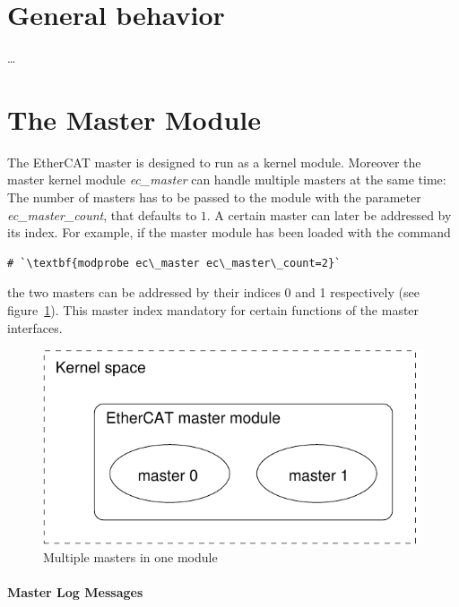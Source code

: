 \documentclass[a4paper,12pt,BCOR6mm,bibtotoc,idxtotoc]{scrbook}
\begin{document}

\section{General behavior} %

\ldots


\section{The Master Module} %
\label{sec:mastermod}

The EtherCAT master is designed to run as a kernel module. Moreover
the master kernel module \textit{ec\_master} can handle multiple
masters at the same time: The number of masters has to be passed to
the module with the parameter \textit{ec\_master\_count}, that
defaults to $1$. A certain master can later be addressed by its index.
For example, if the master module has been loaded with the command

\begin{lstlisting}[gobble=2]
  # `\textbf{modprobe ec\_master ec\_master\_count=2}`
\end{lstlisting}

the two masters can be addressed by their indices 0 and 1 respectively
(see figure~\ref{fig:masters}). This master index mandatory for
certain functions of the master interfaces.

\begin{figure}[htbp]
  \centering
  \includegraphics[width=.5\textwidth]{images/masters}
  \caption{Multiple masters in one module}
  \label{fig:masters}
\end{figure}

\paragraph{Master Log Messages}
\end{document}
